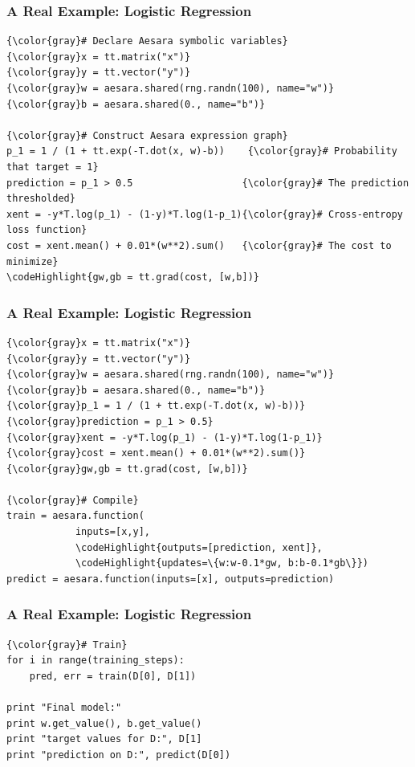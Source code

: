 \documentclass[a4paper,9pt]{beamer}
\begin{document}
\begin{frame}[fragile]
  \frametitle{A Real Example: Logistic Regression}
\begin{Verbatim}[commandchars=\\\{\}]
{\color{gray}# Declare Aesara symbolic variables}
{\color{gray}x = tt.matrix("x")}
{\color{gray}y = tt.vector("y")}
{\color{gray}w = aesara.shared(rng.randn(100), name="w")}
{\color{gray}b = aesara.shared(0., name="b")}

{\color{gray}# Construct Aesara expression graph}
p_1 = 1 / (1 + tt.exp(-T.dot(x, w)-b))    {\color{gray}# Probability that target = 1}
prediction = p_1 > 0.5                   {\color{gray}# The prediction thresholded}
xent = -y*T.log(p_1) - (1-y)*T.log(1-p_1){\color{gray}# Cross-entropy loss function}
cost = xent.mean() + 0.01*(w**2).sum()   {\color{gray}# The cost to minimize}
\codeHighlight{gw,gb = tt.grad(cost, [w,b])}
\end{Verbatim}
\end{frame}

\begin{frame}[fragile]
  \frametitle{A Real Example: Logistic Regression}
\begin{Verbatim}[commandchars=\\\{\}]
{\color{gray}x = tt.matrix("x")}
{\color{gray}y = tt.vector("y")}
{\color{gray}w = aesara.shared(rng.randn(100), name="w")}
{\color{gray}b = aesara.shared(0., name="b")}
{\color{gray}p_1 = 1 / (1 + tt.exp(-T.dot(x, w)-b))}
{\color{gray}prediction = p_1 > 0.5}
{\color{gray}xent = -y*T.log(p_1) - (1-y)*T.log(1-p_1)}
{\color{gray}cost = xent.mean() + 0.01*(w**2).sum()}
{\color{gray}gw,gb = tt.grad(cost, [w,b])}

{\color{gray}# Compile}
train = aesara.function(
            inputs=[x,y],
            \codeHighlight{outputs=[prediction, xent]},
            \codeHighlight{updates=\{w:w-0.1*gw, b:b-0.1*gb\}})
predict = aesara.function(inputs=[x], outputs=prediction)
\end{Verbatim}
\end{frame}

\begin{frame}[fragile]
  \frametitle{A Real Example: Logistic Regression}
\begin{Verbatim}[commandchars=\\\{\}]
{\color{gray}# Train}
for i in range(training_steps):
    pred, err = train(D[0], D[1])

print "Final model:"
print w.get_value(), b.get_value()
print "target values for D:", D[1]
print "prediction on D:", predict(D[0])
\end{Verbatim}
\end{frame}
\end{document}
